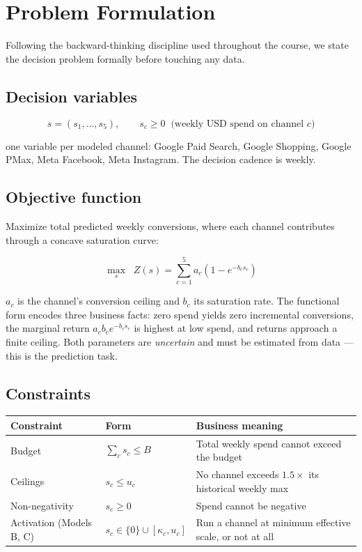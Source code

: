 \documentclass[11pt]{article}
\begin{document}
\section{Problem Formulation}

Following the backward-thinking discipline used throughout the course, we state the decision problem formally before touching any data.

\subsection{Decision variables}

\[
s = (s_1, \dots, s_5), \qquad s_c \ge 0 \;\; \text{(weekly USD spend on channel } c\text{)}
\]

one variable per modeled channel: Google Paid Search, Google Shopping, Google PMax, Meta Facebook, Meta Instagram. The decision cadence is weekly.

\subsection{Objective function}

Maximize total predicted weekly conversions, where each channel contributes through a concave saturation curve:

\[
\max_{s} \;\; Z(s) = \sum_{c=1}^{5} a_c\left(1 - e^{-b_c s_c}\right)
\]

$a_c$ is the channel's conversion ceiling and $b_c$ its saturation rate. The functional form encodes three business facts: zero spend yields zero incremental conversions, the marginal return $a_c b_c e^{-b_c s_c}$ is highest at low spend, and returns approach a finite ceiling. Both parameters are \emph{uncertain} and must be estimated from data --- this is the prediction task.

\subsection{Constraints}

\begin{center}
\begin{tabular}{lll}
\toprule
\textbf{Constraint} & \textbf{Form} & \textbf{Business meaning} \\
\midrule
Budget & $\sum_c s_c \le B$ & Total weekly spend cannot exceed the budget \\
Ceilings & $s_c \le u_c$ & No channel exceeds $1.5\times$ its historical weekly max \\
Non-negativity & $s_c \ge 0$ & Spend cannot be negative \\
Activation (Models B, C) & $s_c \in \{0\} \cup [\kappa_c, u_c]$ & Run a channel at minimum effective scale, or not at all \\
\bottomrule
\end{tabular}
\end{center}
\end{document}
